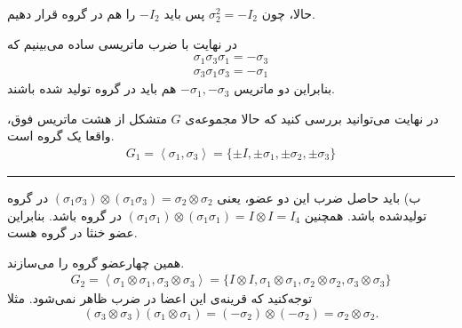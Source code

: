 \documentclass[a4paper, 12pt]{article}
\begin{document}
حالا، چون 
$\sigma_2^2 = -I_2$
پس باید 
$-I_2$
را هم در گروه قرار دهیم.

در نهایت با ضرب ماتریسی ساده می‌بینیم که 
\begin{equation*}
	\begin{aligned}
		\sigma_1\sigma_3\sigma_1 = -\sigma_3 \\
		\sigma_3\sigma_1\sigma_3 = -\sigma_1
	\end{aligned}
\end{equation*}
بنابراین دو ماتریس
$-\sigma_1,-\sigma_3$
هم باید در گروه تولید شده باشند.

در نهایت می‌توانید بررسی کنید که حالا مجموعه‌ی $G$ متشکل از هشت ماتریس فوق، واقعا یک گروه است.
\begin{equation*}
	\begin{aligned}
		G_1 = \left<\sigma_1,\sigma_3 \right> = \{\pm I , \pm \sigma_1 , \pm \sigma_2,\pm \sigma_3\}
	\end{aligned}
\end{equation*}

\par\noindent\rule{\textwidth}{0.6pt}
ب) باید حاصل ضرب این دو عضو‌، یعنی 
$(\sigma_1\sigma_3)\otimes (\sigma_1\sigma_3) = \sigma_2\otimes 
\sigma_2$
در گروه تولید‌شده باشد. همچنین 
$(\sigma_1\sigma_1)\otimes (\sigma_1\sigma_1 ) = I \otimes I = I_4$
در گروه باشد. بنابراین عضو خنثا در گروه هست.

همین چهارعضو گروه را می‌سازند.
\begin{equation*}
	\begin{aligned}
		G_2 = \left<\sigma_1\otimes \sigma_1,\sigma_3\otimes \sigma_3 \right> =  \{ I\otimes I,
		\sigma_1\otimes \sigma_1,\sigma_2\otimes \sigma_2,\sigma_3\otimes \sigma_3
		\}
	\end{aligned}
\end{equation*}
توجه‌کنید که قرینه‌ی این اعضا در ضرب‌ ظاهر نمی‌شود. مثلا 
\[
(\sigma_3 \otimes \sigma_3) (\sigma_1 \otimes \sigma_1) = (-\sigma_2)\otimes (-\sigma_2) = \sigma_2\otimes\sigma_2 .
\]
\end{document}
